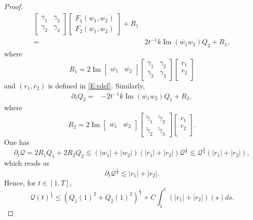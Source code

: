 \documentclass[11pt,a4paper,oneside]{amsart}
\theoremstyle{plain}
\theoremstyle{remark}
\numberwithin{equation}{section}
\renewcommand{\Im}{\operatorname{Im}}
\def\le{\leqslant}
\theoremstyle{definition}
\begin{document}
\begin{proof}
\begin{align*}
	\begin{bmatrix}
	\gamma_1 & \gamma_2 \\ \gamma_2 & \gamma_3
	\end{bmatrix}
	\begin{bmatrix}
	F_1(w_1,w_2) \\ F_2(w_1,w_2)
	\end{bmatrix}
	+R_1\\
	={}&2t^{-1}k \Im (\overline{w_1} w_2) Q_2
	+R_1,
\end{align*}
where
\[
	R_1 = 2 \Im 
	\begin{bmatrix}
	\overline{w_1} & \overline{w_2}
	\end{bmatrix}
	\begin{bmatrix}
	\gamma_1 & \gamma_2 \\ \gamma_2 & \gamma_3
	\end{bmatrix}
	\begin{bmatrix}
	r_1 \\
	r_2\\
	\end{bmatrix}
\]
and $(r_1,r_2)$ is defined in \eqref{E:rdef}.
Similarly,
\begin{align*}
	\partial_t Q_2
	={}&-2t^{-1}k \Im (\overline{w_1} w_2)
	Q_1+R_2,
\end{align*}
where
\[
	R_2 = 2 \Im 
	\begin{bmatrix}
	\overline{w_1} & \overline{w_2}
	\end{bmatrix}
	\begin{bmatrix}
	\widetilde{\gamma}_1 & \widetilde{\gamma}_2 \\ \widetilde{\gamma}_2 & \widetilde{\gamma}_3
	\end{bmatrix}
	\begin{bmatrix}
	r_1 \\
	r_2 \\
	\end{bmatrix}.
\]
One has
\[
	\partial_t \mathcal{Q} = 2R_1Q_1 + 2R_2Q_2 
	\lesssim (|w_1|+|w_2|)(|r_1|+|r_2|)
	\mathcal{Q}^\frac12 
	 \lesssim \mathcal{Q}^\frac34 
	 (|r_1|+|r_2|),
\]
which reads as
\[
	\partial_t \mathcal{Q}^\frac14	
	\lesssim |r_1|+|r_2|. %
\]
Hence, for $t\in [1,T]$,
\begin{equation}\label{E:Qbound}
	\mathcal{Q}(t)^\frac14 \le (Q_1(1)^2 + Q_2(1)^2)^\frac14
+C\int_1^t 
 	(|r_1|+|r_2|)(s)
 	 ds.
\end{equation}


\end{proof}
\end{document}
